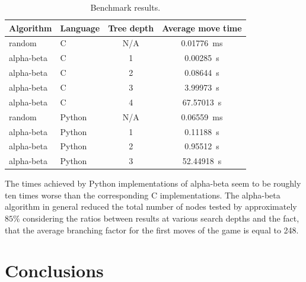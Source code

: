 \begin{table}[t]
\centering\footnotesize
\caption{Benchmark results.}
\label{tab:benchmarks}
\begin{tabular}{l l c S[table-format = 2.5, group-digits = false]}
\toprule
Algorithm  & Language & Tree depth & {Average move time} \\
\midrule
random     & C        & N/A        &  0.01776 \,\si{ms} \\
alpha-beta & C        & 1          &  0.00285 \,\si{s}  \\
alpha-beta & C        & 2          &  0.08644 \,\si{s}  \\
alpha-beta & C        & 3          &  3.99973 \,\si{s}  \\
alpha-beta & C        & 4          & 67.57013 \,\si{s}  \\
random     & Python   & N/A        &  0.06559 \,\si{ms} \\
alpha-beta & Python   & 1          &  0.11188 \,\si{s}  \\
alpha-beta & Python   & 2          &  0.95512 \,\si{s}  \\
alpha-beta & Python   & 3          & 52.44918 \,\si{s}  \\
\bottomrule
\end{tabular}
\end{table}

The times achieved by Python implementations of alpha-beta seem to be roughly ten times worse
than the corresponding C implementations. The alpha-beta algorithm in general reduced the total
number of nodes tested by approximately $85\%$ considering the ratios between results at various
search depths and the fact, that the average branching factor for the first moves of the game is
equal to 248.

\chapter{Conclusions}
\label{chap:conclusions}



